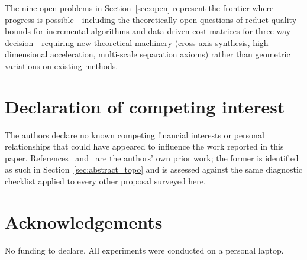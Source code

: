 The nine open problems in Section~\ref{sec:open} represent the frontier
where progress is possible---including the theoretically open questions of
reduct quality bounds for incremental algorithms and data-driven cost matrices
for three-way decision---requiring new theoretical machinery (cross-axis
synthesis, high-dimensional acceleration, multi-scale separation axioms)
rather than geometric variations on existing methods.

\section*{Declaration of competing interest}
The authors declare no known competing financial interests or personal
relationships that could have appeared to influence the work reported in this
paper.  References~\cite{DaiTT2024IFT} and~\cite{Nguyen2026MHMG} are the
authors' own prior work; the former is
identified as such in Section~\ref{sec:abstract_topo} and is assessed against
the same diagnostic checklist applied to every other proposal surveyed here.

\section*{Acknowledgements}
No funding to declare.  All experiments were conducted on a personal laptop.

